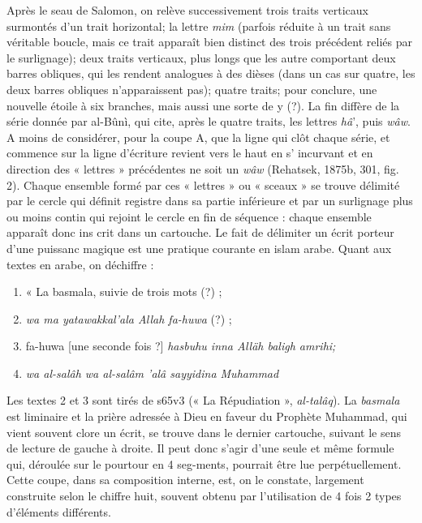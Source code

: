 Après le seau de Salomon, on relève successivement trois traits verticaux
surmontés d'un trait horizontal; la lettre \textit{mim} (parfois réduite à un trait sans véritable boucle, mais ce trait apparaît bien distinct des trois précédent reliés par le surlignage); deux traits verticaux, plus longs que les autre comportant deux barres obliques, qui les rendent analogues à des dièses (dans un cas sur quatre, les deux barres obliques n'apparaissent pas); quatre traits; pour conclure, une nouvelle étoile à six branches, mais aussi une sorte de y (?). La fin diffère de la série donnée par al-Bûnì, qui cite, après le quatre traits, les lettres \textit{\textit{hâ}}', puis \textit{wâw}. A moins de considérer, pour la coupe A, que la ligne qui clôt chaque série, et commence sur la ligne d'écriture revient vers le haut en s' incurvant et en direction des « lettres » précédentes ne soit un \textit{wâw} (Rehatsek, 1875b, 301, fig. 2). Chaque ensemble formé par ces « lettres » ou « sceaux » se trouve délimité par le cercle qui définit registre dans sa partie inférieure et par un surlignage plus ou moins contin qui rejoint le cercle en fin de séquence : chaque ensemble apparaît donc ins crit dans un cartouche. Le fait de délimiter un écrit porteur d'une puissanc magique est une pratique courante en islam arabe. Quant aux textes en arabe, on déchiffre : 
\begin{enumerate}
 
    \item   « La basmala, suivie de trois mots (?) ;   \item  \textit{wa ma
yatawakkal'ala Allah fa-huwa} (?) ;   \item  fa-huwa [une seconde fois ?] \textit{hasbuhu inna Alläh baligh amrihi;}
\item \textit{ wa al-salâh wa al-salâm 'alâ sayyidina Muhammad}
\end{enumerate}
Les textes 2 et 3 sont tirés de s65v3 (« La Répudiation », \textit{al-talâq}). La \textit{basmala} est liminaire et la prière adressée à Dieu en faveur du Prophète Muhammad, qui vient souvent clore un écrit, se trouve dans le dernier cartouche, suivant le sens de lecture de gauche à droite. Il peut donc s'agir d'une seule et même formule qui, déroulée sur le pourtour en 4 seg-ments, pourrait être lue perpétuellement. Cette coupe, dans sa composition interne, est, on le constate, largement construite selon le chiffre huit, souvent obtenu par l'utilisation de 4 fois 2 types d'éléments différents.
 
